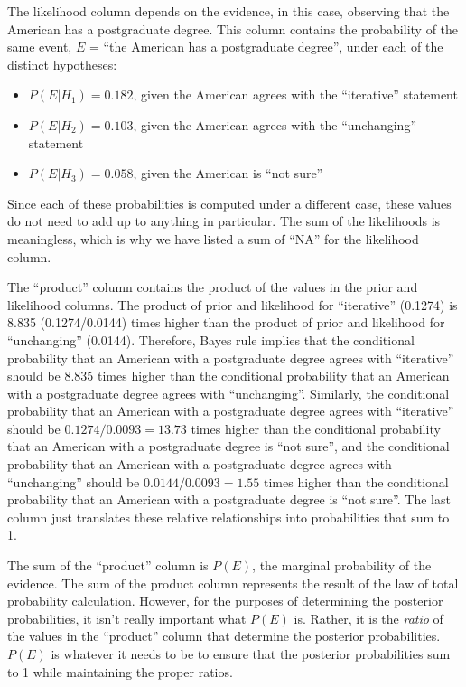 \documentclass[
]{book}
\providecommand{\tightlist}{%
  \setlength{\itemsep}{0pt}\setlength{\parskip}{0pt}}
\theoremstyle{definition}
\theoremstyle{definition}
\theoremstyle{definition}
\theoremstyle{remark}
\begin{document}
The likelihood column depends on the evidence, in this case, observing that the American has a postgraduate degree. This column contains the probability of the same event, \(E\) = ``the American has a postgraduate degree'', under each of the distinct hypotheses:

\begin{itemize}
\tightlist
\item
  \(P(E |H_1) = 0.182\), given the American agrees with the ``iterative'' statement
\item
  \(P(E |H_2) = 0.103\), given the American agrees with the ``unchanging'' statement
\item
  \(P(E |H_3) = 0.058\), given the American is ``not sure''
\end{itemize}

Since each of these probabilities is computed under a different case, these values do not need to add up to anything in particular. The sum of the likelihoods is meaningless, which is why we have listed a sum of ``NA'' for the likelihood column.

The ``product'' column contains the product of the values in the prior and likelihood columns. The product of prior and likelihood for ``iterative'' (0.1274) is 8.835 (0.1274/0.0144) times higher than the product of prior and likelihood for ``unchanging'' (0.0144).
Therefore, Bayes rule implies that the conditional probability that an American with a postgraduate degree agrees with ``iterative'' should be 8.835 times higher than the conditional probability that an American with a postgraduate degree agrees with ``unchanging''.
Similarly, the conditional probability that an American with a postgraduate degree agrees with ``iterative'' should be \(0.1274 / 0.0093 = 13.73\) times higher than the conditional probability that an American with a postgraduate degree is ``not sure'',
and the conditional probability that an American with a postgraduate degree agrees with ``unchanging'' should be \(0.0144 / 0.0093 = 1.55\) times higher than the conditional probability that an American with a postgraduate degree is ``not sure''.
The last column just translates these relative relationships into probabilities that sum to 1.

The sum of the ``product'' column is \(P(E)\), the marginal probability of the evidence. The sum of the product column represents the result of the law of total probability calculation. However, for the purposes of determining the posterior probabilities, it isn't really important what \(P(E)\) is. Rather, it is the \emph{ratio} of the values in the ``product'' column that determine the posterior probabilities. \(P(E)\) is whatever it needs to be to ensure that the posterior probabilities sum to 1 while maintaining the proper ratios.
\end{document}
